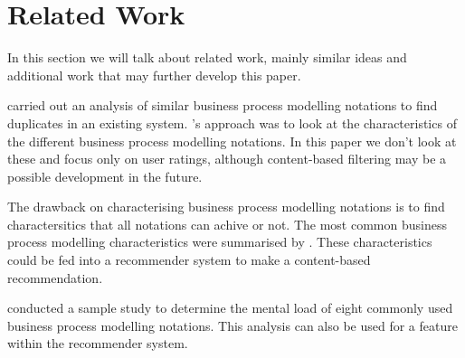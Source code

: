 \chapter{Related Work}

In this section we will talk about related work, mainly similar ideas and additional work that may further develop this paper.


\cite{similarity-bpm} carried out an analysis of similar business process modelling notations to find duplicates in an existing system. \cite{similarity-bpm}'s approach was to look at the characteristics of the different business process modelling notations. In this paper we don't look at these
and focus only on user ratings, although content-based filtering may be a possible development in the future.

The drawback on characterising business process modelling notations is to find charactersitics that all notations can achive or not.
The most common business process modelling characteristics were summarised by \cite{bpm_review_framework}. These characteristics could be fed into a recommender system to make a content-based recommendation.

\cite{zimochMentalLoad} conducted a sample study to determine the mental load of eight commonly used business process modelling notations. This analysis can also be used for a feature within the recommender system.